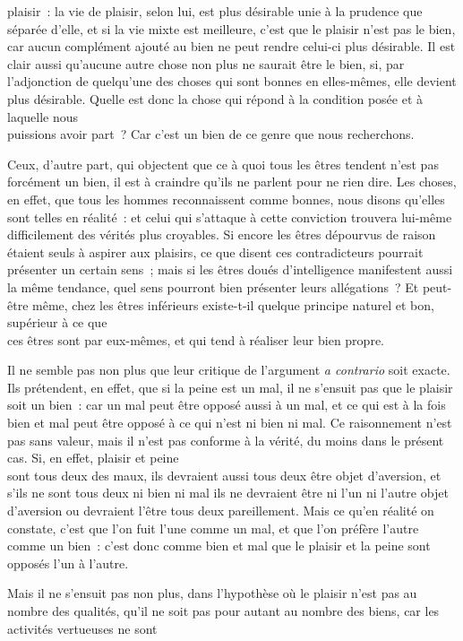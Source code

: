 \documentclass[french,twoside]{book} %
\begin{document}
plaisir : la vie de plaisir, selon lui, est plus désirable unie à la prudence que séparée d’elle, et si la vie mixte est meilleure, c’est que le plaisir n’est pas le bien, car aucun complément ajouté au bien ne peut rendre celui-ci plus désirable. Il est clair aussi qu’aucune autre chose non plus ne saurait être le bien, si, par l’adjonction de quelqu’une des choses qui sont bonnes en elles-mêmes, elle devient plus désirable. Quelle est donc la chose qui répond à la condition posée et à laquelle nous \\
puissions avoir part ? Car c’est un bien de ce genre que nous recherchons.\par
Ceux, d’autre part, qui objectent que ce à quoi tous les êtres tendent n’est pas forcément un bien, il est à craindre qu’ils ne parlent pour ne rien dire. Les choses, en effet, que tous les  hommes reconnaissent comme bonnes, nous disons qu’elles sont telles en réalité : et celui qui s’attaque à cette conviction trouvera lui-même difficilement des vérités plus croyables. Si encore les êtres dépourvus de raison étaient seuls à aspirer aux plaisirs, ce que disent ces contradicteurs pourrait présenter un certain sens ; mais si les êtres doués d’intelligence manifestent aussi la même tendance, quel sens pourront bien présenter leurs allégations ? Et peut-être même, chez les êtres inférieurs existe-t-il quelque principe naturel et bon, supérieur à ce que \\
ces êtres sont par eux-mêmes, et qui tend à réaliser leur bien propre.\par
Il ne semble pas non plus que leur critique de l’argument {\itshape a contrario} soit exacte. Ils prétendent, en effet, que si la peine est un mal, il ne s’ensuit pas que le plaisir soit un bien : car un mal peut être opposé aussi à un mal, et ce qui est à la fois bien et mal peut être opposé à ce qui n’est ni bien ni mal. Ce raisonnement n’est pas sans valeur, mais il n’est pas conforme à la vérité, du moins dans le présent cas. Si, en effet, plaisir et peine \\
sont tous deux des maux, ils devraient aussi tous deux être objet d’aversion, et s’ils ne sont tous deux ni bien ni mal ils ne devraient être ni l’un ni l’autre objet d’aversion ou devraient l’être tous deux pareillement. Mais ce qu’en réalité on constate, c’est que l’on fuit l’une comme un mal, et que l’on préfère l’autre comme un bien : c’est donc comme bien et mal que le plaisir et la peine sont opposés l’un à l’autre.\par
Mais il ne s’ensuit pas non plus, dans l’hypothèse où le plaisir n’est pas au nombre des qualités, qu’il ne soit pas pour autant au nombre des biens, car les activités vertueuses ne sont \\
\end{document}
